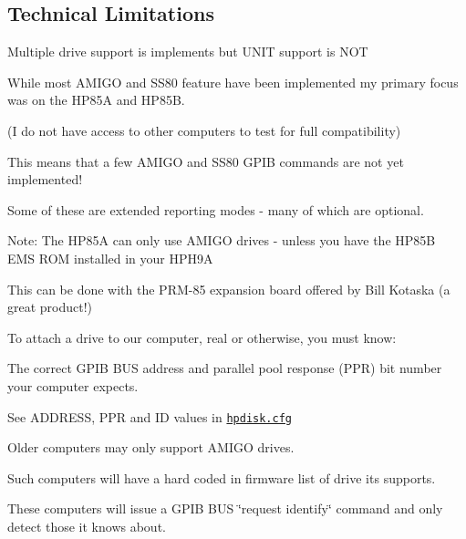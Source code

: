 \subsection*{Technical Limitations}


\begin{DoxyItemize}
\item Multiple drive support is implements but U\+N\+IT support is N\+OT
\item While most A\+M\+I\+GO and S\+S80 feature have been implemented my primary focus was on the H\+P85A and H\+P85B.
\begin{DoxyItemize}
\item (I do not have access to other computers to test for full compatibility)
\item This means that a few A\+M\+I\+GO and S\+S80 G\+P\+IB commands are not yet implemented!
\begin{DoxyItemize}
\item Some of these are extended reporting modes -\/ many of which are optional.
\end{DoxyItemize}
\item Note\+: The H\+P85A can only use A\+M\+I\+GO drives -\/ unless you have the H\+P85B E\+MS R\+OM installed in your H\+P\+H9A
\begin{DoxyItemize}
\item This can be done with the P\+R\+M-\/85 expansion board offered by Bill Kotaska (a great product!)
\end{DoxyItemize}
\end{DoxyItemize}
\item To attach a drive to our computer, real or otherwise, you must know\+:
\begin{DoxyItemize}
\item The correct G\+P\+IB B\+US address and parallel pool response (P\+PR) bit number your computer expects.
\begin{DoxyItemize}
\item See A\+D\+D\+R\+E\+SS, P\+PR and ID values in \href{hpdisk.cfg}{\tt hpdisk.\+cfg}
\end{DoxyItemize}
\item Older computers may only support A\+M\+I\+GO drives.
\begin{DoxyItemize}
\item Such computers will have a hard coded in firmware list of drive its supports.
\begin{DoxyItemize}
\item These computers will issue a G\+P\+IB B\+US \char`\"{}request identify\char`\"{} command and only detect those it knows about.

\end{DoxyItemize}
\end{DoxyItemize}
\end{DoxyItemize}
\end{DoxyItemize}
